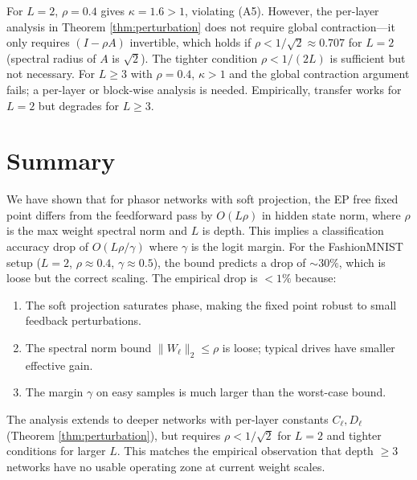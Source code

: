 \documentclass[11pt]{article}
\begin{document}
\begin{remark}
For $L=2$, $\rho=0.4$ gives $\kappa = 1.6 > 1$, violating (A5).
However, the per-layer analysis in Theorem \ref{thm:perturbation}
does not require global contraction—it only requires $(I - \rho A)$
invertible, which holds if $\rho < 1/\sqrt{2} \approx 0.707$ for
$L=2$ (spectral radius of $A$ is $\sqrt{2}$). The tighter condition
$\rho < 1/(2L)$ is sufficient but not necessary. For $L\ge 3$ with
$\rho=0.4$, $\kappa > 1$ and the global contraction argument fails;
a per-layer or block-wise analysis is needed. Empirically, transfer
works for $L=2$ but degrades for $L\ge 3$.
\end{remark}

\section{Summary}

We have shown that for phasor networks with soft projection, the EP
free fixed point differs from the feedforward pass by $O(L\rho)$ in
hidden state norm, where $\rho$ is the max weight spectral norm and
$L$ is depth. This implies a classification accuracy drop of
$O(L\rho/\gamma)$ where $\gamma$ is the logit margin. For the
FashionMNIST setup ($L=2$, $\rho\approx0.4$, $\gamma\approx0.5$), the
bound predicts a drop of $\sim 30\%$, which is loose but the correct
scaling. The empirical drop is $<1\%$ because:
\begin{enumerate}
  \item The soft projection saturates phase, making the fixed point
    robust to small feedback perturbations.
  \item The spectral norm bound $\|W_\ell\|_2 \le \rho$ is loose;
    typical drives have smaller effective gain.
  \item The margin $\gamma$ on easy samples is much larger than the
    worst-case bound.
\end{enumerate}
The analysis extends to deeper networks with per-layer constants
$C_\ell, D_\ell$ (Theorem \ref{thm:perturbation}), but requires
$\rho < 1/\sqrt{2}$ for $L=2$ and tighter conditions for larger $L$.
This matches the empirical observation that depth $\ge 3$ networks
have no usable operating zone at current weight scales.



\end{document}
